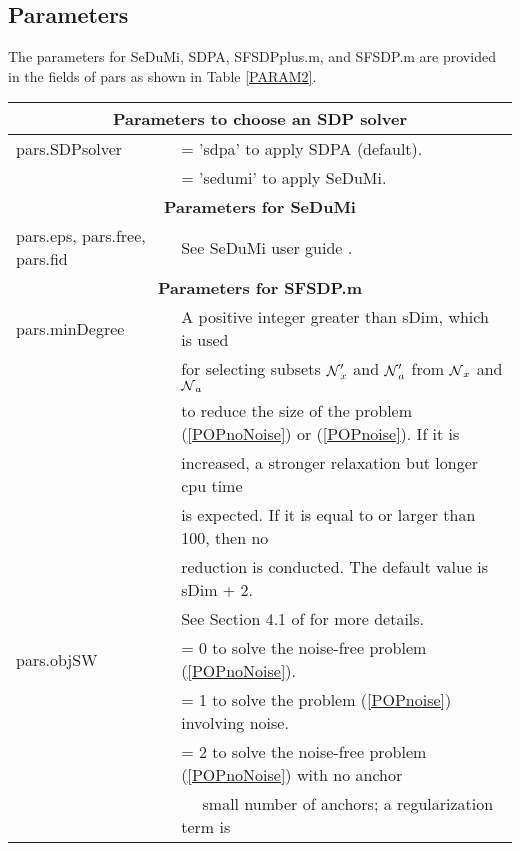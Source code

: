 \documentclass[12pt]{article}
\def\NC{\mbox{$\cal N$}}
\begin{document}
  \subsection{Parameters}
  
\label{PARAM}

The parameters for SeDuMi, SDPA, SFSDPplus.m, and SFSDP.m are provided in the fields of pars 
as shown in Table \ref{PARAM2}. 
\begin{table}[htdp]
\begin{tabular}{| l l |} \hline 
\multicolumn{2}{|c|}{\bf Parameters  to choose an SDP solver} \\  \hline
pars.SDPsolver & = 'sdpa' to apply SDPA (default). \\ 
                              & = 'sedumi' to apply SeDuMi. \\  \hline\hline
\multicolumn{2}{|c|}{\bf Parameters  for SeDuMi} \\  \hline
        pars.eps, pars.free,  pars.fid & 
       See SeDuMi  user guide \cite{SEDUMI}.\\
       \hline
       \hline
\multicolumn{2}{|c|}{\bf Parameters for SFSDP.m}  \\ \hline
       pars.minDegree 
       & A positive integer greater than sDim, which is used \\ 
       & for selecting subsets $\NC'_x$ and $\NC'_a$ from $\NC_x$ and $\NC_a$ \\ 
       & to reduce the size of the 
          problem (\ref{POPnoNoise}) or (\ref{POPnoise}). If it is \\ 
      &  increased, a stronger relaxation but longer cpu time \\ 
     & is expected. If it is equal to or larger than 100, then no \\ 
     & reduction is conducted.  The default value is sDim + 2. \\
     &  See Section  4.1 of \cite{KIM08} for more details. \\ 
       \hline
       pars.objSW  & 
            = 0 to solve the noise-free problem  (\ref{POPnoNoise}). \\ 
          & = 1  to solve the problem  (\ref{POPnoise}) involving noise. \\ 
           &  = 2 to solve the noise-free problem  (\ref{POPnoNoise}) with no anchor \\
           & \mbox{ \ } \hspace{2mm}  small number of anchors; a regularization term is \\

\end{tabular}
\end{table}
\end{document}
